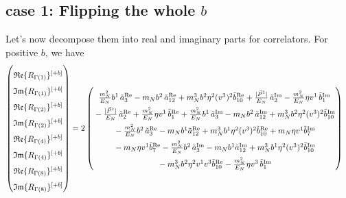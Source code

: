 \documentclass[]{article}
\numberwithin{equation}{section}
\newcommand{\bvec}{b}
\newcommand{\mN}{m_N}
\begin{document}
\subsection{case 1: Flipping the whole $\bvec$}
Let's now decompose them into real and imaginary parts for correlators. For positive $b$, we have 
\begin{align}
    \begin{pmatrix}
        \rule{0pt}{16pt} \mathfrak{Re}\{ R_{\Gamma(1)}\}^{[+b]} \\
        \rule{0pt}{16pt} \mathfrak{Im}\{ R_{\Gamma(1)}\}^{[+b]} \\
        \rule{0pt}{16pt} \mathfrak{Re}\{ R_{\Gamma(2)}\}^{[+b]} \\
        \rule{0pt}{16pt} \mathfrak{Im}\{ R_{\Gamma(2)}\}^{[+b]} \\
        \rule{0pt}{16pt} \mathfrak{Re}\{ R_{\Gamma(4)}\}^{[+b]} \\
        \rule{0pt}{16pt} \mathfrak{Im}\{ R_{\Gamma(4)}\}^{[+b]} \\
        \rule{0pt}{16pt} \mathfrak{Re}\{ R_{\Gamma(8)}\}^{[+b]} \\
        \rule{0pt}{16pt} \mathfrak{Im}\{ R_{\Gamma(8)}\}^{[+b]}
    \end{pmatrix} &= 2\begin{pmatrix}
     \rule{0pt}{16pt}   \frac{\mN^2}{E_N} \bvec^1\, \tilde a^{\text{Re}}_3-  \mN  \bvec^2 \, \tilde a^{\text{Re}}_{12}+  \mN^3  \bvec^2 \eta^2 (v^3)^2 \tilde b^{\text{Re}}_{10} +\frac{|\vec{P}^1|}{E_N}\, \tilde a^{\text{Im}}_2- \frac{\mN^2}{E_N} \eta v^1\, \tilde b^{\text{Im}}_1\\
      \rule{0pt}{16pt}  -\frac{|\vec{P}^1|}{E_N}\, \tilde a^{\text{Re}}_2+ \frac{\mN^2}{E_N} \eta v^1\, \tilde b^{\text{Re}}_1 + \frac{\mN^2}{E_N} \bvec^1\, \tilde a^{\text{Im}}_3-  \mN  \bvec^2 \, \tilde a^{\text{Im}}_{12}+  \mN^3  \bvec^2 \eta^2 (v^3)^2 \tilde b^{\text{Im}}_{10}\\
      \rule{0pt}{16pt}  -  \frac{\mN^2}{E_N} \bvec^2\, \tilde a^{\text{Re}}_3
		-  \mN   \bvec^1  \tilde a^{\text{Re}}_{12}+ \mN^3  \bvec^1 \eta^2 (v^3)^2 \tilde b^{\text{Re}}_{10}+\mN \eta v^1  \tilde b^{\text{Im}}_7 \\
      \rule{0pt}{16pt} - \mN \eta v^1  \tilde b^{\text{Re}}_7 -  \frac{\mN^2}{E_N} \bvec^2\, \tilde a^{\text{Im}}_3
		-  \mN   \bvec^1  \tilde a^{\text{Im}}_{12}+ \mN^3  \bvec^1 \eta^2 (v^3)^2 \tilde b^{\text{Im}}_{10}\\
      \rule{0pt}{16pt} -\mN^3 \bvec^2 \eta^2 v^1 v^3\tilde b^{\text{Re}}_{10}-\frac{\mN^2}{E_N} \eta v^3\, \tilde b^{\text{Im}}_1\\

\end{pmatrix}
\end{align}
\end{document}
